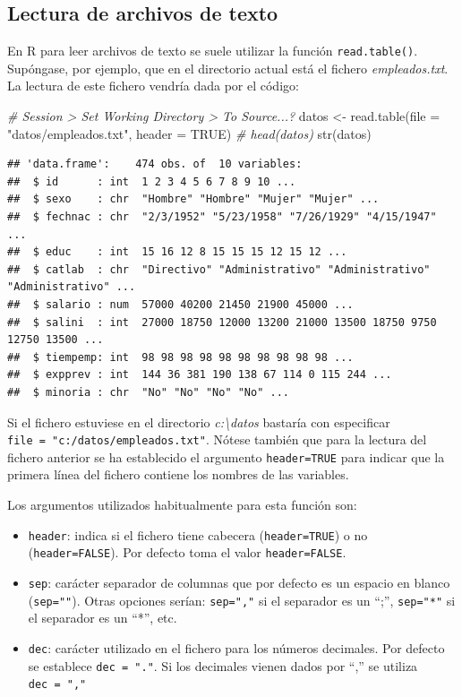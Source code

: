 \documentclass[
]{book}
\newenvironment{Shaded}{\begin{snugshade}}{\end{snugshade}}
\newcommand{\AttributeTok}[1]{\textcolor[rgb]{0.77,0.63,0.00}{#1}}
\newcommand{\CommentTok}[1]{\textcolor[rgb]{0.56,0.35,0.01}{\textit{#1}}}
\newcommand{\ConstantTok}[1]{\textcolor[rgb]{0.00,0.00,0.00}{#1}}
\newcommand{\FunctionTok}[1]{\textcolor[rgb]{0.00,0.00,0.00}{#1}}
\newcommand{\NormalTok}[1]{#1}
\newcommand{\OtherTok}[1]{\textcolor[rgb]{0.56,0.35,0.01}{#1}}
\newcommand{\StringTok}[1]{\textcolor[rgb]{0.31,0.60,0.02}{#1}}
\theoremstyle{break}
\theoremstyle{nonumberplain}
\begin{document}
\hypertarget{cap4-texto}{%
\subsection{Lectura de archivos de texto}\label{cap4-texto}}

En R para leer archivos de texto se suele utilizar la función \texttt{read.table()}.
Supóngase, por ejemplo, que en el directorio actual está el fichero
\emph{empleados.txt}. La lectura de este fichero vendría dada por el código:

\begin{Shaded}
\begin{Highlighting}[]
\CommentTok{\# Session \textgreater{} Set Working Directory \textgreater{} To Source...?}
\NormalTok{datos }\OtherTok{\textless{}{-}} \FunctionTok{read.table}\NormalTok{(}\AttributeTok{file =} \StringTok{"datos/empleados.txt"}\NormalTok{, }\AttributeTok{header =} \ConstantTok{TRUE}\NormalTok{)}
\CommentTok{\# head(datos)}
\FunctionTok{str}\NormalTok{(datos)}
\end{Highlighting}
\end{Shaded}

\begin{verbatim}
## 'data.frame':    474 obs. of  10 variables:
##  $ id      : int  1 2 3 4 5 6 7 8 9 10 ...
##  $ sexo    : chr  "Hombre" "Hombre" "Mujer" "Mujer" ...
##  $ fechnac : chr  "2/3/1952" "5/23/1958" "7/26/1929" "4/15/1947" ...
##  $ educ    : int  15 16 12 8 15 15 15 12 15 12 ...
##  $ catlab  : chr  "Directivo" "Administrativo" "Administrativo" "Administrativo" ...
##  $ salario : num  57000 40200 21450 21900 45000 ...
##  $ salini  : int  27000 18750 12000 13200 21000 13500 18750 9750 12750 13500 ...
##  $ tiempemp: int  98 98 98 98 98 98 98 98 98 98 ...
##  $ expprev : int  144 36 381 190 138 67 114 0 115 244 ...
##  $ minoria : chr  "No" "No" "No" "No" ...
\end{verbatim}

Si el fichero estuviese en el directorio \emph{c:\textbackslash datos} bastaría con especificar
\texttt{file\ =\ "c:/datos/empleados.txt"}.
Nótese también que para la lectura del fichero anterior se ha
establecido el argumento \texttt{header=TRUE} para indicar que la primera línea del
fichero contiene los nombres de las variables.

Los argumentos utilizados habitualmente para esta función son:

\begin{itemize}
\item
  \texttt{header}: indica si el fichero tiene cabecera (\texttt{header=TRUE}) o no
  (\texttt{header=FALSE}). Por defecto toma el valor \texttt{header=FALSE}.
\item
  \texttt{sep}: carácter separador de columnas que por defecto es un espacio
  en blanco (\texttt{sep=""}). Otras opciones serían: \texttt{sep=","} si el separador es
  un ``;'', \texttt{sep="*"} si el separador es un ``*'', etc.
\item
  \texttt{dec}: carácter utilizado en el fichero para los números decimales.
  Por defecto se establece \texttt{dec\ =\ "."}. Si los decimales vienen dados
  por ``,'' se utiliza \texttt{dec\ =\ ","}
\end{itemize}
\end{document}
